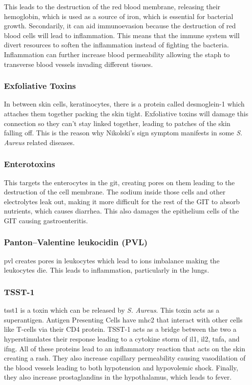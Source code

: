This leads to the destruction of the red blood membrane, releasing their hemoglobin, which is used as a source of iron, which is essential for bacterial growth. Secondarily, it can aid immunoevasion because the destruction of red blood cells will lead to inflammation. This means that the immune system will divert resources to soften the inflammation instead of fighting the bacteria. Inflammation can further increase blood permeability allowing the \gls{staph} to transverse blood vessels invading different tissues.

\subsubsection{Exfoliative Toxins}

In between skin cells, keratinocytes, there is a protein called desmoglein-1 which attaches them together packing the skin tight. Exfoliative toxins will damage this connection so they can't stay linked together, leading to patches of the skin falling off. This is the reason why Nikolski's sign symptom manifests in some \textit{S. Aureus} related diseases.

\subsubsection{Enterotoxins}

This targets the enterocytes in the \gls{git}, creating pores on them leading to the destruction of the cell membrane. The sodium inside those cells and other electrolytes leak out, making it more difficult for the rest of the GIT to absorb nutrients, which causes diarrhea. This also damages the epithelium cells of the GIT causing gastroenteritis.

\subsubsection{Panton–Valentine leukocidin (PVL)}
\label{staphPVL}

\gls{pvl} creates pores in leukocytes which lead to ions imbalance making the leukocytes die. This leads to inflammation, particularly in the lungs.

\subsubsection{TSST-1}
\label{staphTSST1}

\gls{tsst1} is a toxin which can be released by \textit{S. Aureus}. This toxin acts as a superantigen. Antigen Presenting Cells have \gls{mhc2} that interact with other cells like T-cells via their CD4 protein. TSST-1 acts as a bridge between the two a hyperstimulates their response leading to a cytokine storm of \gls{il1}, \gls{il2}, \gls{tnfa}, and \gls{ifng}. All of these proteins lead to an inflammatory reaction that acts on the skin creating a rash. They also increase capillary permeability causing vasodilation of the blood vessels leading to both hypotension and hypovolemic shock. Finally, they also increase prostaglandins in the hypothalamus, which leads to fever.

